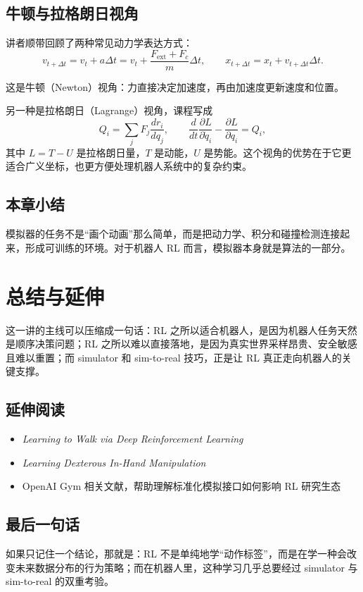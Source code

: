 \documentclass[a4paper]{article}
\begin{document}
\subsection{牛顿与拉格朗日视角}

讲者顺带回顾了两种常见动力学表达方式：
\[
v_{t+\Delta t}=v_t+a\Delta t = v_t+\frac{F_{\mathrm{ext}}+F_c}{m}\Delta t,
\qquad
x_{t+\Delta t}=x_t+v_{t+\Delta t}\Delta t.
\]

这是牛顿（Newton）视角：力直接决定加速度，再由加速度更新速度和位置。

另一种是拉格朗日（Lagrange）视角，课程写成
\[
Q_i=\sum_j F_j \frac{dr_i}{dq_j},
\qquad
\frac{d}{dt}\frac{\partial L}{\partial \dot q_i}-\frac{\partial L}{\partial q_i}=Q_i,
\]
其中 \(L=T-U\) 是拉格朗日量，\(T\) 是动能，\(U\) 是势能。这个视角的优势在于它更适合广义坐标，也更方便处理机器人系统中的复杂约束。

\subsection{本章小结}

模拟器的任务不是“画个动画”那么简单，而是把动力学、积分和碰撞检测连接起来，形成可训练的环境。对于机器人 RL 而言，模拟器本身就是算法的一部分。

\section{总结与延伸}

这一讲的主线可以压缩成一句话：RL 之所以适合机器人，是因为机器人任务天然是顺序决策问题；RL 之所以难以直接落地，是因为真实世界采样昂贵、安全敏感且难以重置；而 simulator 和 sim-to-real 技巧，正是让 RL 真正走向机器人的关键支撑。

\subsection{延伸阅读}

\begin{itemize}
  \item \emph{Learning to Walk via Deep Reinforcement Learning}
  \item \emph{Learning Dexterous In-Hand Manipulation}
  \item OpenAI Gym 相关文献，帮助理解标准化模拟接口如何影响 RL 研究生态
\end{itemize}

\subsection{最后一句话}

如果只记住一个结论，那就是：RL 不是单纯地学“动作标签”，而是在学一种会改变未来数据分布的行为策略；而在机器人里，这种学习几乎总要经过 simulator 与 sim-to-real 的双重考验。
\end{document}

